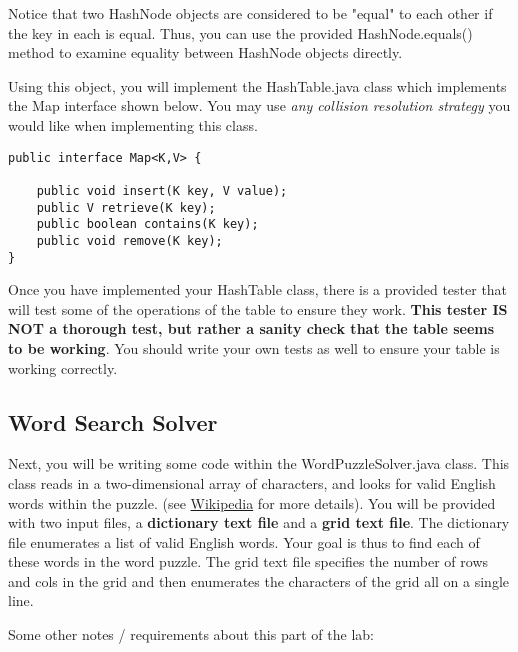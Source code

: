 \documentclass[paper=a4, fontsize=11pt, parskip=full]{scrartcl} %
\numberwithin{equation}{section} %
\numberwithin{figure}{section} %
\numberwithin{table}{section} %
\begin{document}
Notice that two HashNode objects are considered to be "equal" to each other if the key in each is equal. Thus, you can use the provided HashNode.equals() method to examine equality between HashNode objects directly.

Using this object, you will implement the HashTable.java class which implements the Map interface shown below. You may use \emph{any collision resolution strategy} you would like when implementing this class. 

\begin{lstlisting}
public interface Map<K,V> {

	public void insert(K key, V value);
	public V retrieve(K key);
	public boolean contains(K key);
	public void remove(K key);
}
\end{lstlisting}

Once you have implemented your HashTable class, there is a provided tester that will test some of the operations of the table to ensure they work. \textbf{This tester IS NOT a thorough test, but rather a sanity check that the table seems to be working}. You should write your own tests as well to ensure your table is working correctly.

\subsection{Word Search Solver}

Next, you will be writing some code within the WordPuzzleSolver.java class. This class reads in a two-dimensional array of characters, and looks for valid English words within the puzzle. (see \href{https://en.wikipedia.org/wiki/Word_search}{Wikipedia} for more details). You will be provided with two input files, a \textbf{dictionary text file} and a \textbf{grid text file}. The dictionary file enumerates a list of valid English words. Your goal is thus to find each of these words in the word puzzle. The grid text file specifies the number of rows and cols in the grid and then enumerates the characters of the grid all on a single line.

Some other notes / requirements about this part of the lab:
\end{document}
